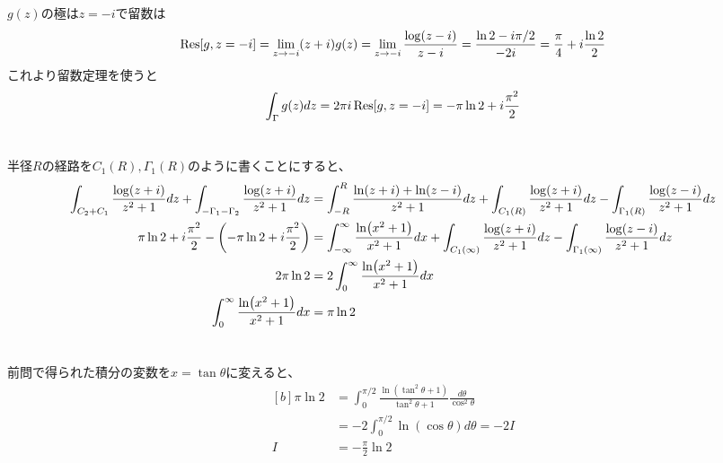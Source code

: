 \documentclass[../ap_2011.tex]{subfiles}
\begin{document}
\section{}
\(g(z)\)の極は\(z=-i\)で留数は
\begin{equation}\begin{aligned}[b]
    \Res[g,z=-i]=\lim_{z\to -i}(z+i)g(z)=\lim_{z\to-i}\frac{\log(z-i)}{z-i}=\frac{\ln2-i\pi/2}{-2i}=\frac{\pi}{4}+i\frac{\ln2}{2}
\end{aligned}\end{equation}
これより留数定理を使うと
\begin{equation}\begin{aligned}[b]
    \int_\Gamma g(z)dz = 2\pi i\Res[g,z=-i]=-\pi\ln 2+i\frac{\pi^2}{2}
\end{aligned}\end{equation}

\section{}
半径\(R\)の経路を\(C_1(R),\Gamma_1(R)\)のように書くことにすると、
\begin{equation}\begin{aligned}[b]
    \int_{C_2+C_1} \frac{\log(z+i)}{z^2+1} dz +\int_{-\Gamma_1-\Gamma_2} \frac{\log(z+i)}{z^2+1} dz
    &= \int_{-R}^{R}\frac{\ln(z+i)+\ln(z-i)}{z^2+1}dz +\int_{C_1(R)}\frac{\log(z+i)}{z^2+1} dz -\int_{\Gamma_1(R)}\frac{\log(z-i)}{z^2+1} dz\\
    \pi\ln2+i\frac{\pi^2}{2}-\qty(-\pi\ln 2+i\frac{\pi^2}{2})
    &= \int_{-\infty}^{\infty}\frac{\ln(x^2+1)}{x^2+1}dx+\int_{C_1(\infty)}\frac{\log(z+i)}{z^2+1} dz -\int_{\Gamma_1(\infty)}\frac{\log(z-i)}{z^2+1} dz\\
    2\pi\ln2 &= 2\int_{0}^{\infty}\frac{\ln(x^2+1)}{x^2+1}dx\\
    \int_{0}^{\infty}\frac{\ln(x^2+1)}{x^2+1}dx &= \pi\ln2
\end{aligned}\end{equation}

\section{}
前問で得られた積分の変数を\(x=\tan\theta\)に変えると、
\begin{equation}\begin{aligned}[b]
    \pi\ln2 &= \int_{0}^{\pi/2}\frac{\ln(\tan^2\theta+1)}{\tan^2\theta+1}\frac{d\theta}{\cos^2\theta}\\
    &= -2\int_{0}^{\pi/2}\ln(\cos\theta)d\theta = -2I\\
    I&= -\frac{\pi}{2}\ln2
\end{aligned}\end{equation}
\end{document}
